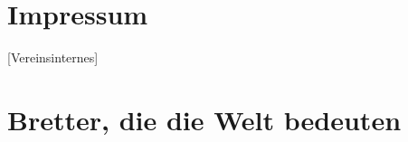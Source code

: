 \documentclass[full]{dtk2}%
\begin{document}
\maketitle

\part{Impressum}


[Vereinsinternes]


\part{Bretter, die die Welt bedeuten}


\clearpage


\listofaddresses

\tableofcontents
\end{document}
